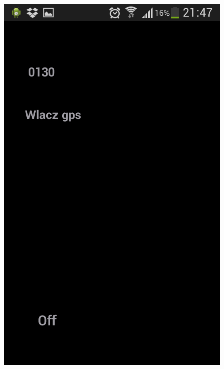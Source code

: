 \documentclass[eng,printmode,oneside]{mgr}
\begin{document}
\begin{figure}
{\includegraphics[height=0.33\textheight]{andGPS.png}
}
\end{figure}
\end{document}
